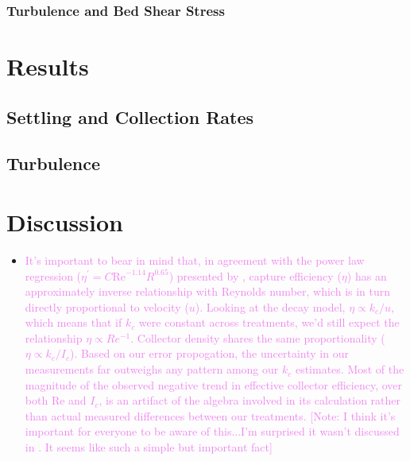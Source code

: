 \documentclass{article}
\newcommand\Rey{\mathrm{Re}}
\begin{document}
\subsubsection{Turbulence and Bed Shear Stress}

\section{Results}

\subsection{Settling and Collection Rates}

\subsection{Turbulence}

\section{Discussion}

\begin{itemize}
    \item \textcolor{violet}{It's important to bear in mind that, in agreement with the power law regression ($\eta^\prime = C\Rey^{-1.14}R^{0.65}$) presented by \cite{Fauria_2015}, capture efficiency ($\eta$) has an approximately inverse relationship with Reynolds number, which is in turn directly proportional to velocity ($u$). Looking at the decay model, $\eta \propto k_c/u$, which means that if $k_c$ were constant across treatments, we'd still expect the relationship $\eta \propto Re^{-1}$. Collector density shares the same proportionality ($\eta \propto k_c/I_c$). Based on our error propogation, the uncertainty in our measurements far outweighs any pattern among our $k_c$ estimates. Most of the magnitude of the observed negative trend in effective collector efficiency, over both $\Rey$ and $I_c$, is an artifact of the algebra involved in its calculation rather than actual measured differences between our treatments. [Note: I think it's important for everyone to be aware of this...I'm surprised it wasn't discussed in \cite{Fauria_2015}. It seems like such a simple but important fact]}
\end{itemize}



\end{document}
